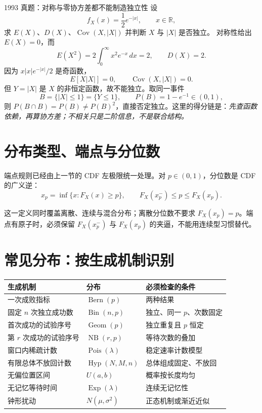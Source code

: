 \documentclass[11pt,a4paper]{ctexart}
\begin{document}
\begin{examplebox}{1993 真题：对称与零协方差都不能制造独立性}
设
\[
f_X(x)=\frac12e^{-\lvert x\rvert},\qquad x\in\mathbb R,
\]
求 $E(X)$、$D(X)$、$\operatorname{Cov}(X,\lvert X\rvert)$ 并判断 $X$ 与 $\lvert X\rvert$ 是否独立。
对称性给出 $E(X)=0$，而
\[
E(X^2)=2\int_0^\infty x^2e^{-x}\,dx=2,
\qquad D(X)=2.
\]
因为 $x\lvert x\rvert e^{-\lvert x\rvert}/2$ 是奇函数，
\[
E[X\lvert X\rvert]=0,\qquad \operatorname{Cov}(X,\lvert X\rvert)=0.
\]
但 $Y=\lvert X\rvert$ 是 $X$ 的非恒定函数，故不能独立。取同一事件
\[
B=\{\lvert X\rvert\le1\}=\{Y\le1\},\qquad P(B)=1-e^{-1}\in(0,1),
\]
则 $P(B\cap B)=P(B)\ne P(B)^2$，直接否定独立。这里的得分链是：\emph{先查函数依赖，再算协方差；不相关只是二阶信息，不是联合结构。}
\end{examplebox}

\section{分布类型、端点与分位数}

端点规则已经由上一节的 CDF 左极限统一处理。对 $p\in(0,1)$，分位数是 CDF 的广义逆：
\[
\boxed{x_p=\inf\{x:F_X(x)\ge p\}},
\qquad F_X(x_p^-)\le p\le F_X(x_p).
\]

这一定义同时覆盖离散、连续与混合分布；离散分位数不要求 $F_X(x_p)=p$。端点有原子时，必须保留 $F_X(x_p^-)$ 与 $F_X(x_p)$ 的夹逼，不能用连续型习惯替代。

\section{常见分布：按生成机制识别}

\begin{center}
\begin{tabularx}{\linewidth}{L{3.4cm}L{3.4cm}Y}
\toprule
生成机制 & 分布 & 必须检查的条件 \\
\midrule
一次成败指标 & $\operatorname{Bern}(p)$ & 两种结果 \\
固定 $n$ 次独立成功数 & $\operatorname{Bin}(n,p)$ & 独立、同一 $p$、次数固定 \\
首次成功的试验序号 & $\operatorname{Geom}(p)$ & 独立重复且 $p$ 恒定 \\
第 $r$ 次成功的试验序号 & $\operatorname{NB}(r,p)$ & 等待次数的叠加 \\
窗口内稀疏计数 & $\operatorname{Pois}(\lambda)$ & 稳定速率计数模型 \\
有限总体不放回计数 & $\operatorname{Hyp}(N,M,n)$ & 总体组成固定、不放回 \\
无偏位置区间 & $U(a,b)$ & 概率按长度均匀 \\
无记忆等待时间 & $\operatorname{Exp}(\lambda)$ & 连续无记忆性 \\
钟形扰动 & $N(\mu,\sigma^2)$ & 正态机制或渐近近似 \\
\bottomrule
\end{tabularx}
\end{center}
\end{document}

